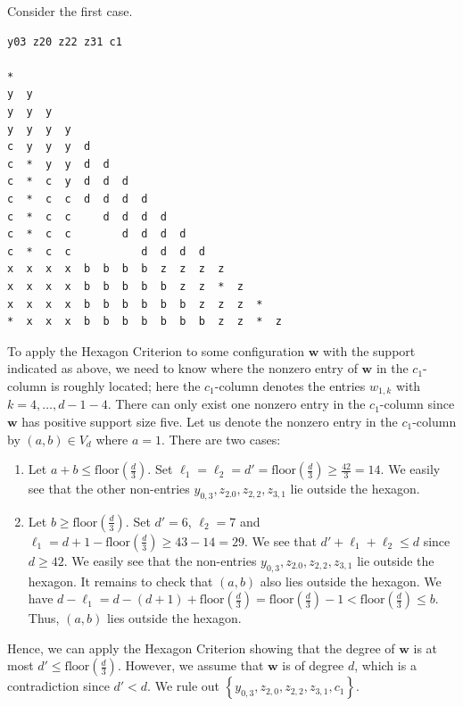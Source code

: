 \begin{example}\label{ex:324jjhsdbvuysduyg2yrguy23hriuwfiueonw}
    Consider the first case.
    
\begin{verbatim}
y03 z20 z22 z31 c1

*  
y  y  
y  y  y  
y  y  y  y  
c  y  y  y  d  
c  *  y  y  d  d  
c  *  c  y  d  d  d  
c  *  c  c  d  d  d  d  
c  *  c  c     d  d  d  d  
c  *  c  c        d  d  d  d  
c  *  c  c           d  d  d  d  
x  x  x  x  b  b  b  b  z  z  z  z  
x  x  x  x  b  b  b  b  b  z  z  *  z  
x  x  x  x  b  b  b  b  b  b  z  z  z  *  
*  x  x  x  b  b  b  b  b  b  b  z  z  *  z  
\end{verbatim}
To apply the Hexagon Criterion to some configuration \( \mathbf{w} \) with the support indicated as above, we need to know where the nonzero entry of \( \mathbf{w} \) in the \( c_1 \)-column is roughly located; here the \( c_1 \)-column denotes the entries \( w_{1,k} \) with \( k = 4, \dots, d - 1 - 4 \). There can only exist one nonzero entry in the \( c_1 \)-column since \( \mathbf{w} \) has positive support size five. Let us denote the nonzero entry in the \( c_1 \)-column by \( (a,b) \in V_d \) where \( a = 1 \). There are two cases:
\begin{enumerate}
    \item Let \( a + b \leq \mathrm{floor}(\frac{d}{3})\). Set \( \ell_1 = \ell_2 = d' =  \mathrm{floor}(\frac{d}{3}) \geq \frac{42}{3} = 14 \). We easily see that the other non-entries \( y_{0,3}, z_{2.0}, z_{2,2}, z_{3,1} \) lie outside the hexagon.
    \item Let \( b \geq \mathrm{floor}(\frac{d}{3})  \). Set \( d' = 6 \), \( \ell_2 = 7 \) and \( \ell_1 = d + 1 - \mathrm{floor}(\frac{d}{3}) \geq 43 - 14 = 29 \). We see that \( d' + \ell_1 + \ell_2 \leq d \) since \( d \geq 42 \). We easily see that the non-entries \( y_{0,3}, z_{2.0}, z_{2,2}, z_{3,1} \) lie outside the hexagon. It remains to check that \( (a,b) \) also lies outside the hexagon. We have \( d - \ell_1 = d - (d + 1) + \mathrm{floor}(\frac{d}{3}) =\mathrm{floor}(\frac{d}{3}) - 1 < \mathrm{floor}(\frac{d}{3}) \leq b \). Thus, \( (a,b) \) lies outside the hexagon.
\end{enumerate}
Hence, we can apply the Hexagon Criterion showing that the degree of \( \mathbf{w} \) is at most \( d' \leq \mathrm{floor}(\frac{d}{3}) \). However, we assume that \( \mathbf{w} \) is of degree \( d \), which is a contradiction since \( d' < d \). We rule out \( \left\{ y_{0,3}, z_{2,0}, z_{2,2}, z_{3,1}, c_1 \right\} \).
\end{example}

